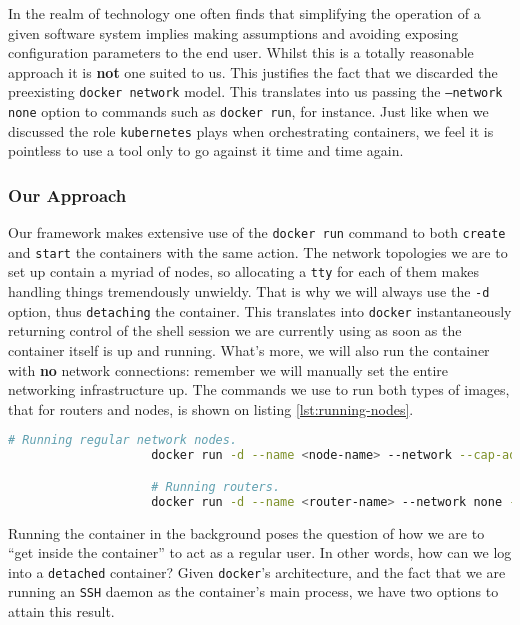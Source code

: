                 In the realm of technology one often finds that simplifying the operation of a given software system implies making assumptions and avoiding exposing configuration parameters to the end user. Whilst this is a totally reasonable approach it is \textbf{not} one suited to us. This justifies the fact that we discarded the preexisting \texttt{docker network} model. This translates into us passing the \texttt{--network none} option to commands such as \texttt{docker run}, for instance. Just like when we discussed the role \texttt{kubernetes} plays when orchestrating containers, we feel it is pointless to use a tool only to go against it time and time again.\\

            \subsubsection{Our Approach}
                Our framework makes extensive use of the \texttt{docker run} command to both \texttt{create} and \texttt{start} the containers with the same action. The network topologies we are to set up contain a myriad of nodes, so allocating a \texttt{tty} for each of them makes handling things tremendously unwieldy. That is why we will always use the \texttt{-d} option, thus \texttt{detaching} the container. This translates into \texttt{docker} instantaneously returning control of the shell session we are currently using as soon as the container itself is up and running. What's more, we will also run the container with \textbf{no} network connections: remember we will manually set the entire networking infrastructure up. The commands we use to run both types of images, that for routers and nodes, is shown on listing \ref{lst:running-nodes}.\\

                \begin{lstlisting}[language = bash, caption = Running network nodes., label = lst:running-nodes]
                    # Running regular network nodes.
                    docker run -d --name <node-name> --network --cap-add SYS_ADMIN none ubuntu_node

                    # Running routers.
                    docker run -d --name <router-name> --network none --cap-add SYS_ADMIN --cap-add NET_ADMIN --sysctl net.ipv4.ip_forward=1 ubuntu_router
                \end{lstlisting}

                Running the container in the background poses the question of how we are to ``get inside the container'' to act as a regular user. In other words, how can we log into a \texttt{detached} container? Given \texttt{docker}'s architecture, and the fact that we are running an \texttt{SSH} daemon as the container's main process, we have two options to attain this result.\\

